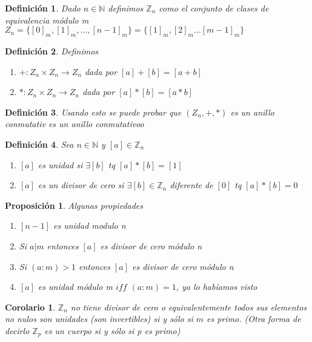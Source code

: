 \documentclass{article}
\theoremstyle{break}
\newtheorem{corollary}{Corolario}[theorem]
\newtheorem{proposition}{Proposición}
\newtheorem{definition}{Definición}[section]
\def \N{\mathbb{N}}
\def \Z{\mathbb{Z}}
\begin{document}
        \begin{definition}
            Dado $n\in\N$ definimos $\Z_n$ como el conjunto de clases de equivalencia módulo m
            $Z_n = \{[0]_m,[1]_m,\ldots , [n-1]_m\} = \{[1]_m,[2]_m \ldots [m-1]_m\}$
        \end{definition}
        \begin{definition}
            Definimos 
            \begin{enumerate}
                \item $+:Z_n\times Z_n \rightarrow Z_n $ dada por $[a]+[b] = [a+b]$
                \item $*:Z_n\times Z_n \rightarrow Z_n $ dada por $ [a]*[b] = [a*b]$
            \end{enumerate}
        \end{definition}     
        
        \begin{definition}
            Usando esto se puede probar que $(Z_n,+,*)$ es un anillo conmutativ es un anillo conmutativoo
        \end{definition}


        \begin{definition}
            Sea $n\in\N$ y $[a]\in \Z_n$
            \begin{enumerate}
                \item $[a]$ es unidad si $\exists [b]$ tq $[a]* [b] = [1]$
                \item $[a]$ es un divisor de cero si $\exists [b]\in \Z_n $ diferente de $[0]$ 
                tq $[a]* [b]=0$
            \end{enumerate}
        \end{definition}

        \begin{proposition}
            Algunas propiedades
            \begin{enumerate}
                \item $[n-1]$ es unidad modulo n
                \item Si $a|m$ entonces $[a]$ es divisor de cero módulo n
                \item Si $(a:m) > 1$ entonces $[a]$ es divisor de cero módulo n
                \item $[a]$ es unidad módulo m $iff$ $(a:m)=1$, ya lo habíamos visto
            \end{enumerate} 

        \end{proposition}
        \begin{corollary}
            $\Z_n$ no tiene divisor de cero o equivalentemente todos sus elementos no nulos son unidades
            (son invertibles) si y sólo si $m$ es primo. (Otra forma de decirlo $\Z_p$ es un cuerpo si 
            y sólo si p es primo)
        \end{corollary}
\end{document}
